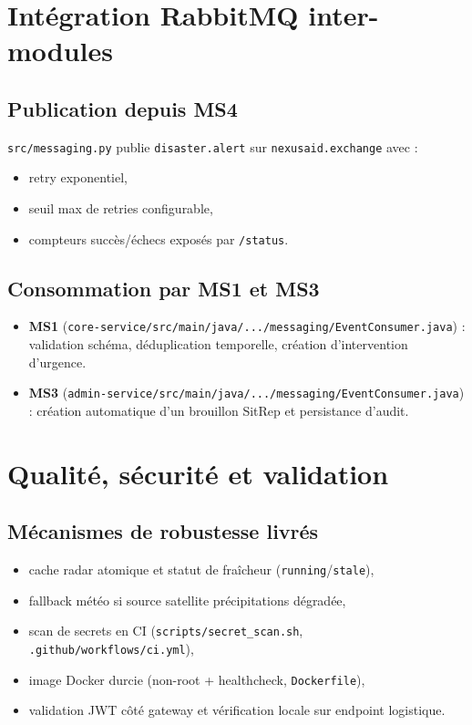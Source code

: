 \section{Int\'egration RabbitMQ inter-modules}
\subsection{Publication depuis MS4}
\texttt{src/messaging.py} publie \texttt{disaster.alert} sur \texttt{nexusaid.exchange} avec :
\begin{itemize}
    \item retry exponentiel,
    \item seuil max de retries configurable,
    \item compteurs succ\`es/\'echecs expos\'es par \texttt{/status}.
\end{itemize}

\subsection{Consommation par MS1 et MS3}
\begin{itemize}
    \item \textbf{MS1} (\texttt{core-service/src/main/java/.../messaging/EventConsumer.java}) : validation sch\'ema, d\'eduplication temporelle, cr\'eation d'intervention d'urgence.
    \item \textbf{MS3} (\texttt{admin-service/src/main/java/.../messaging/EventConsumer.java}) : cr\'eation automatique d'un brouillon SitRep et persistance d'audit.
\end{itemize}

\section{Qualit\'e, s\'ecurit\'e et validation}
\subsection{M\'ecanismes de robustesse livr\'es}
\begin{itemize}
    \item cache radar atomique et statut de fra\^icheur (\texttt{running}/\texttt{stale}),
    \item fallback m\'et\'eo si source satellite pr\'ecipitations d\'egrad\'ee,
    \item scan de secrets en CI (\texttt{scripts/secret\_scan.sh}, \texttt{.github/workflows/ci.yml}),
    \item image Docker durcie (non-root + healthcheck, \texttt{Dockerfile}),
    \item validation JWT c\^ot\'e gateway et v\'erification locale sur endpoint logistique.
\end{itemize}

